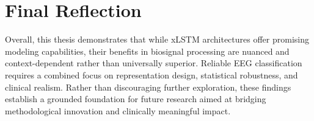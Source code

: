 \section{Final Reflection}

Overall, this thesis demonstrates that while \ac{xLSTM} architectures offer promising modeling capabilities, their benefits in biosignal processing are nuanced and context-dependent rather than universally superior. Reliable \ac{EEG} classification requires a combined focus on representation design, statistical robustness, and clinical realism. Rather than discouraging further exploration, these findings establish a grounded foundation for future research aimed at bridging methodological innovation and clinically meaningful impact.
